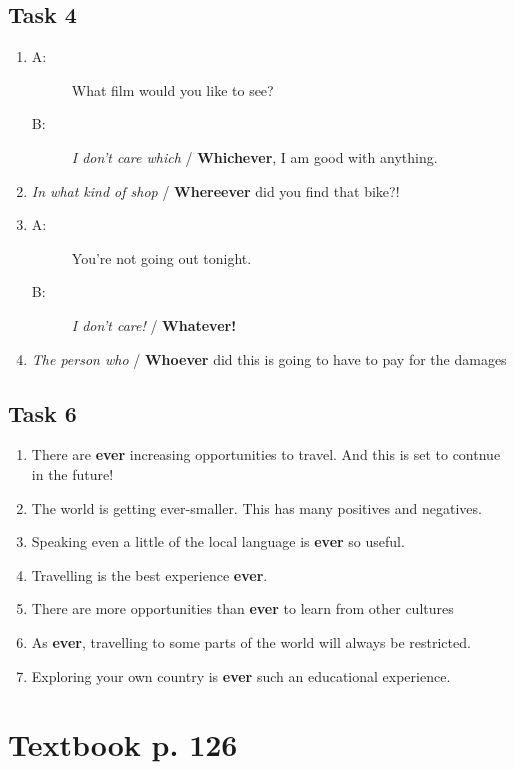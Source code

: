 \documentclass[a4paper]{article}
\begin{document}
\subsection*{Task 4}
\begin{enumerate}
    \item \begin{description}
        \item[A:] What film would you like to see?
        \item[B:] \emph{I don't care which} / \textbf{Whichever}, I am good with anything.
    \end{description}
    \item \emph{In what kind of shop} / \textbf{Whereever} did you find that bike?!
    \item \begin{description}
        \item[A:] You're not going out tonight.
        \item[B:] \emph{I don't care!} / \textbf{Whatever!}
    \end{description}
    \item \emph{The person who} / \textbf{Whoever} did this is going to have to pay for the damages
\end{enumerate}
\subsection*{Task 6}
\begin{enumerate}
    \item There are \textbf{ever} increasing opportunities to travel. And this is set to contnue in the future!
    \item The world is getting ever-smaller. This has many positives and negatives.
    \item Speaking even a little of the local language is \textbf{ever} so useful.
    \item Travelling is the best experience \textbf{ever}.
    \item There are more opportunities than \textbf{ever} to learn from other cultures
    \item As \textbf{ever}, travelling to some parts of the world will always be restricted.
    \item Exploring your own country is \textbf{ever} such an educational experience.
\end{enumerate}
\section*{Textbook p. 126}
\end{document}
